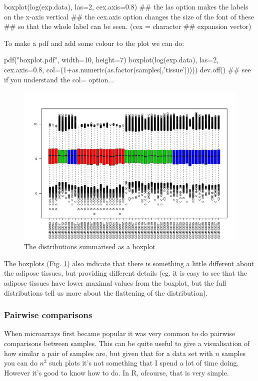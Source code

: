 \documentclass[11pt]{article}
\begin{document}
\begin{rcode}
  boxplot(log(exp.data), las=2, cex.axis=0.8)
  ## the las option makes the labels on the x-axis vertical
  ## the cex.axis option changes the size of the font of these
  ## so that the whole label can be seen. (cex = character
  ## expansion vector)
\end{rcode}

To make a pdf and add some colour to the plot we can do:

\begin{rcode}
  pdf("boxplot.pdf", width=10, height=7)
  boxplot(log(exp.data), las=2, cex.axis=0.8, col=(1+as.numeric(as.factor(samples[,'tissue']))))
  dev.off()
  ## see if you understand the col= option...
\end{rcode}

\begin{figure}[ht]
  \includegraphics[width=\textwidth]{images/boxplot}
  \caption{The distributions summarised as a boxplot}
  \label{boxplot}
\end{figure}

The boxplots (Fig. \ref{boxplot}) also indicate that there is something
a little different about the adipose tissues, but providing different
details (eg. it is easy to see that the adipose tissues have lower maximal
values from the boxplot, but the full distributions tell us more about the
flattening of the distribution).

\subsubsection{Pairwise comparisons}
\label{sec-1-3-2}
When microarrays first became popular it was very common to
do pairwise comparisons between samples. This can be quite useful
to give a visualisation of how similar a pair of samples are, but
given that for a data set with $n$ samples you can do $n^2$ such
plots it's not something that I spend a lot of time doing. However
it's good to know how to do. In R, ofcourse, that is very simple.
\end{document}
